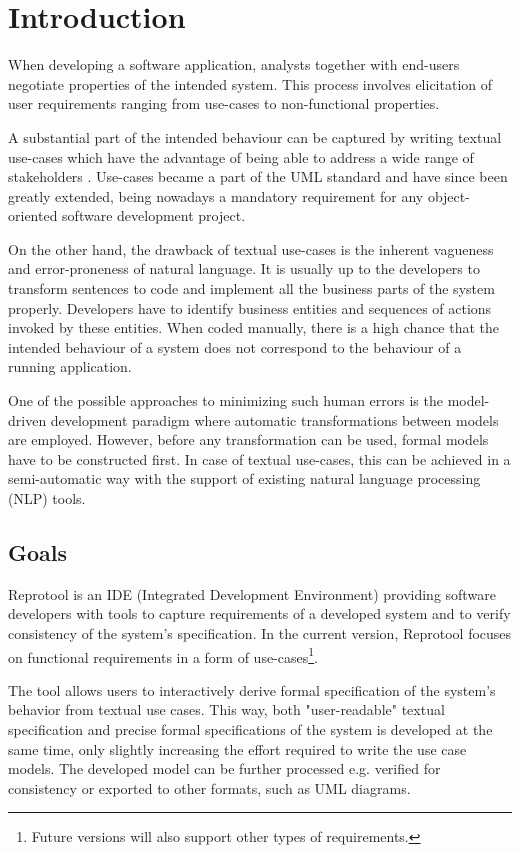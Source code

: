 \section{Introduction}

When developing a software application, analysts together with end-users negotiate properties of the intended system. This process involves elicitation of user requirements ranging from use-cases to non-functional properties.

A substantial part of the intended behaviour can be captured by writing textual use-cases which have the advantage of being able to address a wide range of stakeholders \cite{Larman,Cockburn:2000:WEU:517669}. Use-cases became a part of the UML standard \cite{UML-standard} and have since been greatly extended, being nowadays a mandatory requirement for any object-oriented software development project.

On the other hand, the drawback of textual use-cases is the inherent vagueness and error-proneness of natural language. It is usually up to the developers to transform sentences to code and implement all the business parts of the system properly. Developers have to identify business entities and sequences of actions invoked by these entities. When coded manually, there is a high chance that the intended behaviour of a system does not correspond to the behaviour of a running application.

One of the possible approaches to minimizing such human errors is the model-driven development paradigm \cite{MDD} where automatic transformations between models are employed. However, before any transformation can be used, formal models have to be constructed first. In case of textual use-cases, this can be achieved in a semi-automatic way with the support of existing natural language processing (NLP) tools.

\subsection{Goals}
Reprotool is an IDE (Integrated Development Environment) providing software developers with tools to capture requirements of a developed system and to verify consistency of the system's specification. In the current version, Reprotool focuses on functional requirements in a form of  use-cases\footnote{Future versions will also support other types of requirements.}.

The tool allows users to interactively derive formal specification of the system's behavior from textual use cases. This way, both "user-readable" textual specification and precise formal specifications of the system is developed at the same time, only slightly increasing the effort required to write the use case models. The developed model can be further processed e.g. verified for consistency or exported to other formats, such as UML diagrams.

